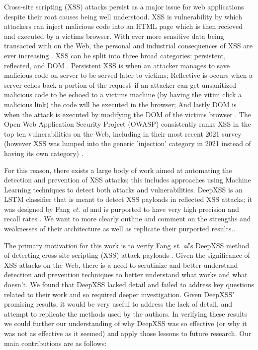 Cross-site scripting (XSS) attacks persist as a major issue for web applications despite their root causes being well understood. XSS is vulnerability by which attackers can inject malicious code into an HTML page which is then recieved and executed by a victims browser. With ever more sensitive data being transacted with on the Web, the personal and industrial consequences of XSS are ever increasing \cite{andreeva2016industrial}. XSS can be split into three broad categories: persistent, reflected, and DOM \cite{gupta2017cross}. Persistent XSS is when an attacker manages to save malicious code on server to be served later to victims; Reflective is occurs when a server echos back a portion of the request--if an attacker can get unsanitized malicious code to be echoed to a victims machine (by having the vitim click a malicious link) the code will be executed in the browser; And lastly DOM is when the attack is executed by modifying the DOM of the victims browser \cite{gupta2017cross}. The Open Web Application Security Project (OWASP) consistently ranks XSS in the top ten vulnerabilities on the Web, including in their most recent 2021 survey (however XSS was lumped into the generic 'injection' category in 2021 instead of having its own category) \cite{owasp}. 

For this reason, there exists a large body of work aimed at automating the detection and prevention of XSS attacks; this includes approaches using Machine Learning techniques to detect both attacks and vulnerabilities. DeepXSS is an LSTM classifier that is meant to detect XSS payloads in reflected XSS attacks; it was designed by Fang \textit{et. al} and is purported to have very high precision and recall rates \cite{fang2018deepxss}. We want to more clearly outline and comment on the strengths and weaknesses of their architecture as well as replicate their purported results.\cite{fang2018deepxss}. 

The primary motivation for this work is to verify Fang \textit{et. al}'s DeepXSS method of detecting cross-site scripting (XSS) attack payloads \cite{fang2018deepxss}. Given the significance of XSS attacks on the Web, there is a need to scrutinize and better understand detection and prevention techniques to better understand what works and what doesn't. We found that DeepXSS lacked detail and failed to address key questions related to their work and so required deeper investigation. Given DeepXSS' promising results, it would be very useful to address the lack of detail, and attempt to replicate the methods used by the authors.  In verifying these results we could further our understanding of why DeepXSS was so effective (or why it was not as effective as it seemed) and apply those lessons to future research. Our main contributions are as follows:

